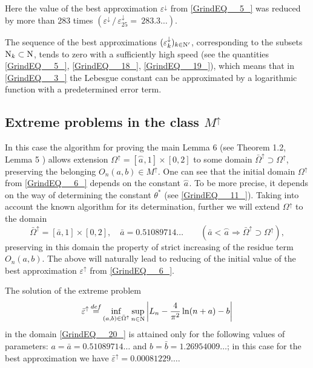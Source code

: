 \documentclass[
11pt,%
tightenlines,%
twoside,%
onecolumn,%
nofloats,%
nobibnotes,%
nofootinbib,%
superscriptaddress,%
noshowpacs,%
centertags]%
{revtex4}
\begin{document}
Here the value of the best approximation $\varepsilon ^{\downarrow } $ from \eqref{GrindEQ__5_} was reduced by more than 283 times $( \varepsilon ^{\downarrow }\, / \,\varepsilon _{25}^{\downarrow }  =\ 283.3\dots) $.


\begin{remark}
The sequence of the best approximations $(\varepsilon _{k}^{\downarrow } )_{k\in {\rm N}'}$, corresponding to the subsets ${\rm N} _{k} \subset {\rm N} $, tends to zero with a sufficiently high speed (see the quantities \eqref{GrindEQ__5_}, \eqref{GrindEQ__18_}, \eqref{GrindEQ__19_}), which means that in \eqref{GrindEQ__3_} the Lebesgue constant can be approximated by a logarithmic function with a predetermined error term.
\end{remark}

\subsection{Extreme problems in the class $M^{\uparrow } $}
In this case the algorithm for proving the main Lemma 6 (see Theorem 1.2, Lemma 5 \cite{Sh19}) allows extension $\Omega ^{\uparrow } = [ \stackrel{\frown}{a} ,    1]\times [0,   2]$ to some domain $\bar{\Omega }^{\uparrow }  \supset   \Omega ^{\uparrow }  $, preserving the belonging $O_{n} (a,   b)\in  M^{\uparrow } $. One can see that the initial domain $\Omega ^{\uparrow } $ from \eqref{GrindEQ__6_} depends on the constant $\stackrel{\frown}{a}$. To be more precise, it depends on the way of determining the constant $\theta ^{*}  $ (see \eqref{GrindEQ__11_}). Taking into account the known \cite{Sh19} algorithm for its determination, further we will extend $\Omega ^{\uparrow } $ to the domain
\begin{equation}\label{GrindEQ__20_}
\bar{\Omega }^{\uparrow } = [ \bar{a}, 1]\times [0, 2],\quad \bar{a}= 0.51089714\dots \qquad (\bar{a} <\stackrel{\frown}{a}\Rightarrow  \bar{\Omega }^{\uparrow } \supset  \Omega ^{\uparrow } ),
\end{equation}
preserving in this domain the property of strict increasing of the residue term $ O_{n} (a, b)$. The above will naturally lead to reducing of the initial value of the best approximation $\varepsilon ^{\uparrow } $ from \eqref{GrindEQ__6_}.

\begin{theorem*}
The solution of the extreme problem
\begin{equation} \label{GrindEQ__21_} \bar{\varepsilon }^{\uparrow }  \mathop{=}\limits^{def}  \mathop{\inf }\limits_{(a,  b)  \in  \bar{\Omega }^{\uparrow }  }   \mathop{\sup  }\limits_{n\in {\rm N} } \left| L_{n} -  \frac{4}{\pi ^{2} } \ln (n+a)   -  b \right|  \end{equation}
in the domain \eqref{GrindEQ__20_} is attained only for the following values of parameters: $a=\bar{a} = 0.51089714\dots $  and  $b= \bar{b}= 1.26954009\dots $;
	in this case for the best approximation we have $\bar{\varepsilon }^{\uparrow } = 0.00081229\dots $.
\end{theorem*}
\end{document}
